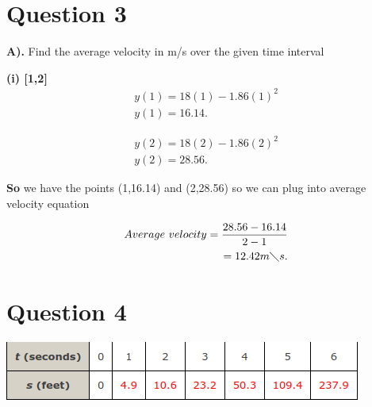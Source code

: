 \documentclass{report}
\begin{document}
    \pagebreak
    \section{\Large{Question 3}}

    \bigbreak \noindent 
    \textbf{A).} Find the average velocity in m/s over the given time interval  
   
    \bigbreak \noindent 
    \textbf{(i) [1,2]} 
    \begin{align*}
        y \left(1\right) = 18 \left(1\right) - 1.86 \left(1\right) ^2 \\
        y \left(1\right) = 16.14
    .\end{align*}

    \bigbreak \noindent  
    \begin{align*}
        y \left(2\right) = 18 \left(2\right) - 1.86 \left(2\right) ^2 \\ 
        y \left(2\right) = 28.56 
    .\end{align*}

    \bigbreak \noindent 
    \textbf{So} we have the points (1,16.14) and (2,28.56) so we can plug into average 
    velocity equation

    \bigbreak \noindent 
    \begin{align*}
        Average\ velocity = \frac{28.56 - 16.14}{2-1} \\
        = 12.42 m \diagdown s
    .\end{align*}

    \pagebreak
    \section{\Large{Question 4}}

    \bigbreak \noindent \bigbreak \noindent 
    
    \bigbreak \noindent 
    \begin{center}
        \includegraphics[scale=0.7]{hw4.png}
    \end{center}
    
\end{document}
